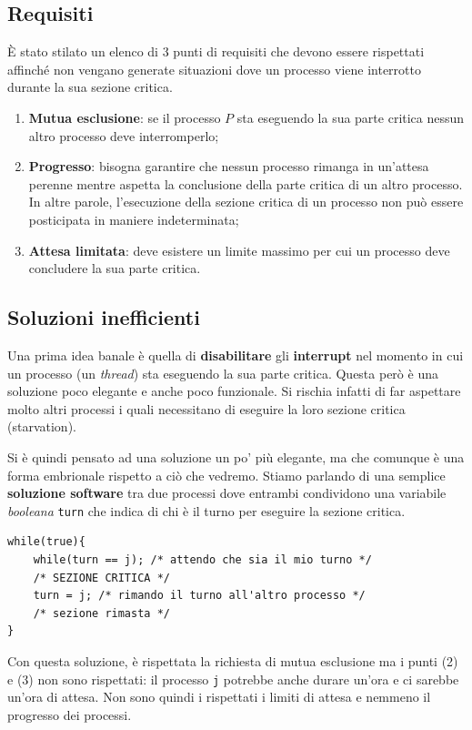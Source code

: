 \subsection{Requisiti}\label{CS requisiti}
È stato stilato un elenco di 3 punti di requisiti che devono essere rispettati affinché non vengano generate situazioni dove un processo viene interrotto durante la sua sezione critica.
\begin{enumerate}
    \item \textbf{Mutua esclusione}: se il processo $P$ sta eseguendo la sua parte critica nessun altro processo deve interromperlo;
    \item \textbf{Progresso}: bisogna garantire che nessun processo rimanga in un'attesa perenne mentre aspetta la conclusione della parte critica di un altro processo. In altre parole, l'esecuzione della sezione critica di un processo non può essere posticipata in maniere indeterminata;
    \item \textbf{Attesa limitata}: deve esistere un limite massimo per cui un processo deve concludere la sua parte critica. 
\end{enumerate}
% 
\subsection{Soluzioni inefficienti}
Una prima idea banale è quella di \textbf{disabilitare} gli \textbf{interrupt} nel momento in cui un processo (un \textit{thread}) sta eseguendo la sua parte critica. Questa però è una soluzione poco elegante e anche poco funzionale. Si rischia infatti di far aspettare molto altri processi i quali necessitano di eseguire la loro sezione critica (starvation). 

Si è quindi pensato ad una soluzione un po' più elegante, ma che comunque è una forma embrionale rispetto a ciò che vedremo. Stiamo parlando di una semplice \textbf{soluzione software} tra due processi dove entrambi condividono una variabile \textit{booleana} \texttt{turn} che indica di chi è il turno per eseguire la sezione critica.
\begin{lstlisting}
while(true){
    while(turn == j); /* attendo che sia il mio turno */
    /* SEZIONE CRITICA */
    turn = j; /* rimando il turno all'altro processo */
    /* sezione rimasta */
}
\end{lstlisting}
Con questa soluzione, è rispettata la richiesta di mutua esclusione ma i punti (2) e (3) non sono rispettati: il processo \texttt{j} potrebbe anche durare un'ora e ci sarebbe un'ora di attesa. Non sono quindi i rispettati i limiti di attesa e nemmeno il progresso dei processi.
% 
